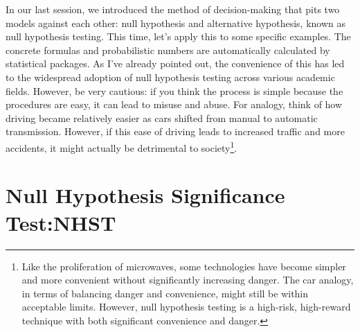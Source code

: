 \documentclass{ltjsbook}
\begin{document}
In our last session, we introduced the method of decision-making that pits two models against each other: null hypothesis and alternative hypothesis, known as null hypothesis testing. This time, let's apply this to some specific examples. The concrete formulas and probabilistic numbers are automatically calculated by statistical packages. As I've already pointed out, the convenience of this has led to the widespread adoption of null hypothesis testing across various academic fields. However, be very cautious: if you think the process is simple because the procedures are easy, it can lead to misuse and abuse. For analogy, think of how driving became relatively easier as cars shifted from manual to automatic transmission. However, if this ease of driving leads to increased traffic and more accidents, it might actually be detrimental to society\footnote{Like the proliferation of microwaves, some technologies have become simpler and more convenient without significantly increasing danger. The car analogy, in terms of balancing danger and convenience, might still be within acceptable limits. However, null hypothesis testing is a high-risk, high-reward technique with both significant convenience and danger.}.


\section{Null Hypothesis Significance Test:NHST}
\end{document}
